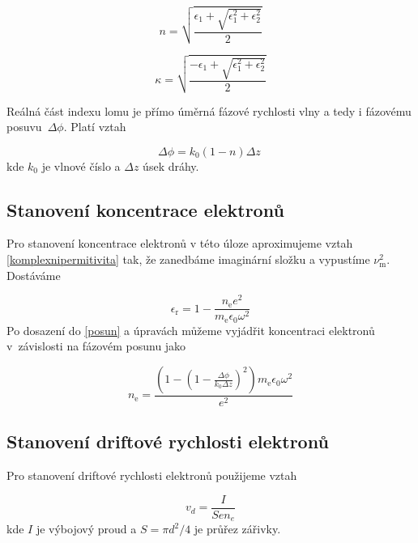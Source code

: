 \documentclass[a4paper,12pt]{article}
\begin{document}
\begin{equation}
	n = \sqrt{\frac{\epsilon_1 + \sqrt{\epsilon_1^2 + \epsilon_2^2}}{2}}
	\label{realna}
\end{equation}

\begin{equation}
	\kappa = \sqrt{\frac{-\epsilon_1 + \sqrt{\epsilon_1^2 + \epsilon_2^2}}{2}}
	\label{imaginarni}
\end{equation}

Reálná část indexu lomu je
přímo úměrná fázové rychlosti vlny a tedy i fázovému posuvu~$\Delta\phi$. Platí vztah

\begin{equation}
 	\Delta\phi = k_0(1-n) \Delta
z~\label{posun}
\end{equation}
kde $k_0$ je vlnové číslo a $\Delta z$ úsek dráhy.  

\subsection{Stanovení koncentrace elektronů}
Pro stanovení koncentrace elektronů v této úloze aproximujeme vztah 
\eqref{komplexnipermitivita} tak, že zanedbáme imaginární složku a vypustíme 
$\nu_\text{m}^2$. Dostáváme

\begin{equation}
	\epsilon_\text{r} = 1- \frac{n_\text{e} e^2}{m_\text{e} \epsilon_0 \omega^2}
	\label{permitivita}
\end{equation}
Po dosazení do \eqref{posun} a úpravách můžeme vyjádřit koncentraci elektronů
v~závislosti na fázovém posunu jako

\begin{equation}
	n_\text{e} = \frac{\left(1-\left(1-\frac{\Delta\phi}{k_0 \Delta z} 
	\right)^2\right)
	m_\text{e} \epsilon_0 \omega^2}{e^2}
\label{eq:koncentrace}
\end{equation}

\subsection{Stanovení driftové rychlosti elektronů}
Pro stanovení driftové rychlosti elektronů použijeme vztah

\begin{equation}
	v_d = \frac{I}{S e n_e}
	\label{eq:vd}
\end{equation}
kde $I$ je výbojový proud a $S = \pi d^2/4$ je průřez zářivky.
\end{document}
